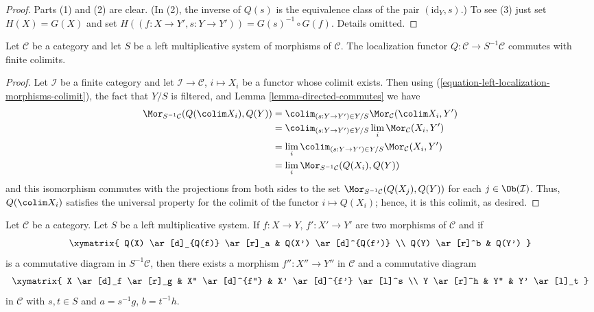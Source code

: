 \begin{proof}
Parts (1) and (2) are clear. (In (2), the inverse of $Q(s)$ is
the equivalence class of the pair $(\text{id}_Y, s)$.)
To see (3) just set $H(X) = G(X)$
and set $H((f : X \to Y', s : Y \to Y')) = G(s)^{-1} \circ G(f)$.
Details omitted.
\end{proof}

\begin{lemma}
\label{lemma-left-localization-limits}
Let $\mathcal{C}$ be a category and let $S$ be a left multiplicative
system of morphisms of $\mathcal{C}$. The localization functor
$Q : \mathcal{C} \to S^{-1}\mathcal{C}$ commutes with finite colimits.
\end{lemma}

\begin{proof}
Let $\mathcal{I}$ be a finite category and let
$\mathcal{I} \to \mathcal{C}$, $i \mapsto X_i$
be a functor whose colimit exists. Then using
(\ref{equation-left-localization-morphisms-colimit}),
the fact that $Y/S$ is filtered, and
Lemma \ref{lemma-directed-commutes} we have
\begin{align*}
\Mor_{S^{-1}\mathcal{C}}(Q(\colim X_i), Q(Y))
& =
\colim_{(s : Y \to Y') \in Y/S} \Mor_\mathcal{C}(\colim X_i, Y') \\
& =
\colim_{(s : Y \to Y') \in Y/S} \lim_i \Mor_\mathcal{C}(X_i, Y') \\
& =
\lim_i \colim_{(s : Y \to Y') \in Y/S} \Mor_\mathcal{C}(X_i, Y') \\
& =
\lim_i \Mor_{S^{-1}\mathcal{C}}(Q(X_i), Q(Y))
\end{align*}
and this isomorphism commutes with the projections
from both sides to the set
$\Mor_{S^{-1}\mathcal{C}}(Q(X_j), Q(Y))$ for each
$j \in \Ob(\mathcal{I})$. Thus, $Q(\colim X_i)$ satisfies
the universal property for the colimit of the functor
$i \mapsto Q(X_i)$; hence, it is this colimit, as desired.
\end{proof}

\begin{lemma}
\label{lemma-left-localization-diagram}
Let $\mathcal{C}$ be a category. Let $S$ be a left multiplicative
system. If $f : X \to Y$, $f' : X' \to Y'$ are two morphisms of
$\mathcal{C}$ and if
$$
\xymatrix{
Q(X) \ar[d]_{Q(f)} \ar[r]_a & Q(X') \ar[d]^{Q(f')} \\
Q(Y) \ar[r]^b & Q(Y')
}
$$
is a commutative diagram in $S^{-1}\mathcal{C}$, then there exists
a morphism $f'' : X'' \to Y''$ in $\mathcal{C}$ and a commutative
diagram
$$
\xymatrix{
X \ar[d]_f \ar[r]_g & X'' \ar[d]^{f''} & X' \ar[d]^{f'} \ar[l]^s \\
Y \ar[r]^h & Y'' & Y' \ar[l]_t
}
$$
in $\mathcal{C}$ with $s, t \in S$ and $a = s^{-1}g$, $b = t^{-1}h$.
\end{lemma}

